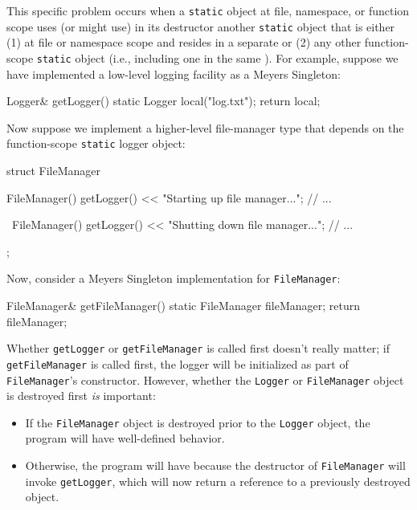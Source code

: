 This specific problem occurs when a \lstinline!static! object at file,
namespace, or function scope uses (or might use) in its destructor
another \lstinline!static! object that is either (1) at file or namespace
scope and resides in a separate  or (2) any other
function-scope \lstinline!static! object (i.e., including one in the same
). For example, suppose we have implemented a low-level
logging facility as a Meyers Singleton:

\begin{emcppslisting}[emcppsbatch=e15]
Logger& getLogger()
{
    static Logger local("log.txt");
    return local;
}
\end{emcppslisting}

\noindent Now suppose we implement a higher-level file-manager type that depends
on the function-scope \lstinline!static! logger object:

\begin{emcppslisting}[emcppsbatch=e15]
struct FileManager
{
    FileManager()
    {
         getLogger() << "Starting up file manager...";
         // ...
    }

    ~FileManager()
    {
        getLogger() << "Shutting down file manager...";
        // ...
    }
};
\end{emcppslisting}

\noindent Now, consider a Meyers Singleton implementation for
\lstinline!FileManager!:

\begin{emcppslisting}[emcppsbatch=e15]
FileManager& getFileManager()
{
    static FileManager fileManager;
    return fileManager;
}
\end{emcppslisting}

\noindent Whether \lstinline!getLogger! or \lstinline!getFileManager! is called first
doesn't really matter; if \lstinline!getFileManager! is called first, the
logger will be initialized as part of \lstinline!FileManager!'s
constructor. However, whether the \lstinline!Logger! or
\lstinline!FileManager! object is destroyed first \emph{is} important:

\begin{itemize}
\item{If the \lstinline!FileManager! object is destroyed prior to the \lstinline!Logger! object, the program will have well-defined behavior.}
\item{Otherwise, the program will have  because the destructor of \lstinline!FileManager! will invoke \lstinline!getLogger!, which will now return a reference to a previously destroyed object.}
\end{itemize}


